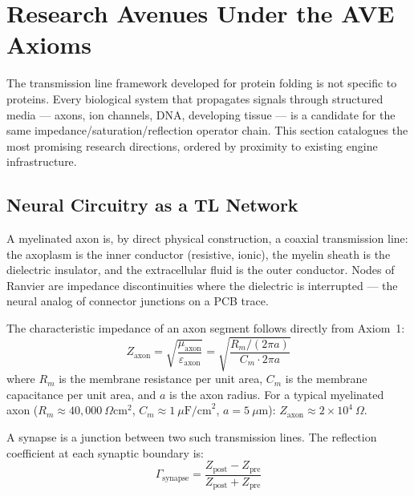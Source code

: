 \section{Research Avenues Under the AVE Axioms}
\label{sec:research_avenues}

The transmission line framework developed for protein folding
is not specific to proteins.  Every biological system that
propagates signals through structured media --- axons, ion
channels, DNA, developing tissue --- is a candidate for the
same impedance/saturation/reflection operator chain.  This
section catalogues the most promising research directions,
ordered by proximity to existing engine infrastructure.

\subsection{Neural Circuitry as a TL Network}
\label{sec:neural_tl}

A myelinated axon is, by direct physical construction, a
coaxial transmission line: the axoplasm is the inner conductor
(resistive, ionic), the myelin sheath is the dielectric
insulator, and the extracellular fluid is the outer conductor.
Nodes of Ranvier are impedance discontinuities where the
dielectric is interrupted --- the neural analog of connector
junctions on a PCB trace.

The characteristic impedance of an axon segment follows
directly from Axiom~1:
\begin{equation}
    Z_\text{axon} = \sqrt{\frac{\mu_\text{axon}}{\varepsilon_\text{axon}}}
    = \sqrt{\frac{R_m / (2\pi a)}{C_m \cdot 2\pi a}}
    \label{eq:z_axon}
\end{equation}
where $R_m$ is the membrane resistance per unit area, $C_m$
is the membrane capacitance per unit area, and $a$ is the
axon radius.  For a typical myelinated axon ($R_m \approx
40{,}000~\Omega\text{cm}^2$, $C_m \approx 1~\mu\text{F/cm}^2$,
$a = 5~\mu\text{m}$): $Z_\text{axon} \approx 2 \times 10^4~\Omega$.

A synapse is a junction between two such transmission lines.
The reflection coefficient at each synaptic boundary is:
\begin{equation}
    \Gamma_\text{synapse} = \frac{Z_\text{post} - Z_\text{pre}}
                                  {Z_\text{post} + Z_\text{pre}}
    \label{eq:gamma_synapse}
\end{equation}

